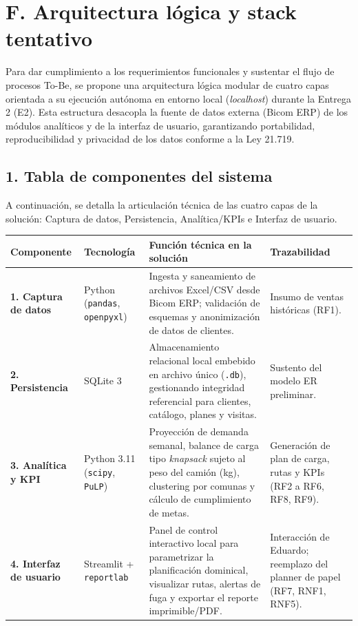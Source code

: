\documentclass[10pt,a4paper]{article}
\begin{document}
\section*{F. Arquitectura lógica y stack tentativo}

Para dar cumplimiento a los requerimientos funcionales y sustentar el flujo de procesos To-Be, se propone una arquitectura lógica modular de cuatro capas orientada a su ejecución autónoma en entorno local (\textit{localhost}) durante la Entrega 2 (E2). Esta estructura desacopla la fuente de datos externa (Bicom ERP) de los módulos analíticos y de la interfaz de usuario, garantizando portabilidad, reproducibilidad y privacidad de los datos conforme a la Ley 21.719.

\subsection*{1. Tabla de componentes del sistema}

A continuación, se detalla la articulación técnica de las cuatro capas de la solución: Captura de datos, Persistencia, Analítica/KPIs e Interfaz de usuario.

\vspace{0.2cm}
\begin{center}
\small
\renewcommand{\arraystretch}{1.25}
\begin{tabular}{|p{2.3cm}|p{2.6cm}|p{6.0cm}|p{3.1cm}|}
\hline
\textbf{Componente} & \textbf{Tecnología} & \textbf{Función técnica en la solución} & \textbf{Trazabilidad} \\ \hline
\textbf{1. Captura de datos} & Python (\texttt{pandas}, \texttt{openpyxl}) & Ingesta y saneamiento de archivos Excel/CSV desde Bicom ERP; validación de esquemas y anonimización de datos de clientes. & Insumo de ventas históricas (RF1). \\ \hline
\textbf{2. Persistencia} & SQLite 3 & Almacenamiento relacional local embebido en archivo único (\texttt{.db}), gestionando integridad referencial para clientes, catálogo, planes y visitas. & Sustento del modelo ER preliminar. \\ \hline
\textbf{3. Analítica y KPI} & Python 3.11 (\texttt{scipy}, \texttt{PuLP}) & Proyección de demanda semanal, balance de carga tipo \textit{knapsack} sujeto al peso del camión (kg), clustering por comunas y cálculo de cumplimiento de metas. & Generación de plan de carga, rutas y KPIs (RF2 a RF6, RF8, RF9). \\ \hline
\textbf{4. Interfaz de usuario} & Streamlit + \texttt{reportlab} & Panel de control interactivo local para parametrizar la planificación dominical, visualizar rutas, alertas de fuga y exportar el reporte imprimible/PDF. & Interacción de Eduardo; reemplazo del planner de papel (RF7, RNF1, RNF5). \\ \hline
\end{tabular}
\end{center}
\vspace{0.3cm}
\end{document}
